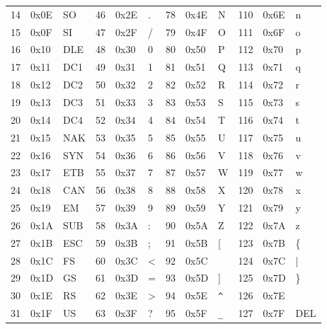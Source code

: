 \documentclass{book}
\begin{document}
{\begin{tabular}{|lll|lll|lll|lll|}
   14 &  0x0E &   SO &   46 &  0x2E &    . &   78 &  0x4E &    N &  110 &  0x6E &    n \\
   15 &  0x0F &   SI &   47 &  0x2F &    / &   79 &  0x4F &    O &  111 &  0x6F &    o \\
   16 &  0x10 &  DLE &   48 &  0x30 &    0 &   80 &  0x50 &    P &  112 &  0x70 &    p \\
   17 &  0x11 &  DC1 &   49 &  0x31 &    1 &   81 &  0x51 &    Q &  113 &  0x71 &    q \\
   18 &  0x12 &  DC2 &   50 &  0x32 &    2 &   82 &  0x52 &    R &  114 &  0x72 &    r \\
   19 &  0x13 &  DC3 &   51 &  0x33 &    3 &   83 &  0x53 &    S &  115 &  0x73 &    s \\
   20 &  0x14 &  DC4 &   52 &  0x34 &    4 &   84 &  0x54 &    T &  116 &  0x74 &    t \\
   21 &  0x15 &  NAK &   53 &  0x35 &    5 &   85 &  0x55 &    U &  117 &  0x75 &    u \\
   22 &  0x16 &  SYN &   54 &  0x36 &    6 &   86 &  0x56 &    V &  118 &  0x76 &    v \\
   23 &  0x17 &  ETB &   55 &  0x37 &    7 &   87 &  0x57 &    W &  119 &  0x77 &    w \\
   24 &  0x18 &  CAN &   56 &  0x38 &    8 &   88 &  0x58 &    X &  120 &  0x78 &    x \\
   25 &  0x19 &   EM &   57 &  0x39 &    9 &   89 &  0x59 &    Y &  121 &  0x79 &    y \\
   26 &  0x1A &  SUB &   58 &  0x3A &    : &   90 &  0x5A &    Z &  122 &  0x7A &    z \\
   27 &  0x1B &  ESC &   59 &  0x3B &    ; &   91 &  0x5B &    [ &  123 &  0x7B &   \{ \\
   28 &  0x1C &   FS &   60 &  0x3C &    < &   92 &  0x5C &    \ &  124 &  0x7C &    | \\
   29 &  0x1D &   GS &   61 &  0x3D &    = &   93 &  0x5D &    ] &  125 &  0x7D &   \} \\
   30 &  0x1E &   RS &   62 &  0x3E &    > &   94 &  0x5E & \verb|^| &  126 &  0x7E &    ~ \\
   31 &  0x1F &   US &   63 &  0x3F &    ? &   95 &  0x5F & \verb|_| &  127 &  0x7F & DEL \\

\end{tabular}

}
\end{document}
